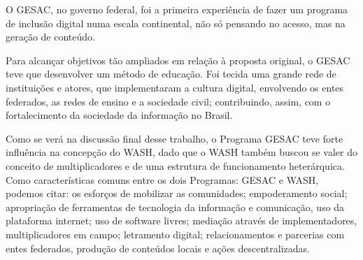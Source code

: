 O GESAC, no governo federal, foi a primeira experiência de fazer um programa de inclusão digital numa escala continental, não só pensando no acesso, mas na geração de conteúdo.


\noindent\begin{flushright}\mbox{\linespread{1}\selectfont\centering{}}\end{flushright}


Para alcançar objetivos tão ampliados em relação à proposta original, o GESAC teve que desenvolver um método de educação. Foi tecida uma grande rede de instituições e atores, que  implementaram  a cultura digital, envolvendo os entes federados, as redes de ensino  e a sociedade civil;  contribuindo, assim, com o fortalecimento da sociedade da informação no Brasil.


\noindent\begin{flushright}\mbox{\linespread{1}\selectfont\centering{}}\end{flushright}


Como se verá na discussão final desse trabalho, o Programa GESAC teve forte influência na concepção do WASH, dado que o WASH também buscou se valer do conceito de multiplicadores e de uma estrutura de funcionamento heterárquica. Como características comuns entre os dois Programas: GESAC e WASH, podemos citar:  os esforços de mobilizar as comunidades; empoderamento social; apropriação de ferramentas de tecnologia da informação e comunicação, uso da plataforma internet; uso de software livres; mediação através de implementadores, multiplicadores em campo; letramento digital; relacionamentos e parcerias com entes federados, produção de conteúdos locais e ações descentralizadas.

